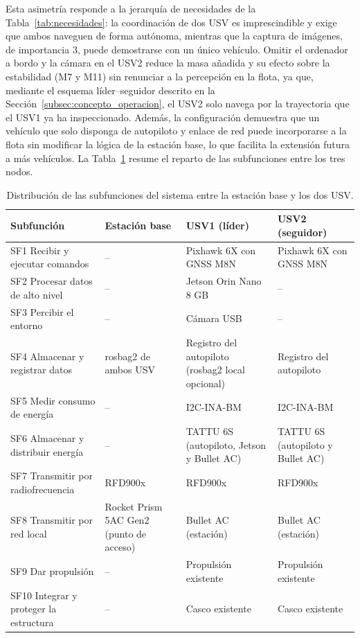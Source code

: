 Esta asimetría responde a la jerarquía de necesidades de la Tabla~\ref{tab:necesidades}: la coordinación de dos 
USV es imprescindible y exige que ambos naveguen de forma autónoma, mientras que la captura de imágenes, de 
importancia 3, puede demostrarse con un único vehículo. Omitir el ordenador a bordo y la cámara en el USV2 reduce 
la masa añadida y su efecto sobre la estabilidad (M7 y M11) sin renunciar a la percepción en la flota, ya que, 
mediante el esquema líder--seguidor descrito en la Sección~\ref{subsec:concepto_operacion}, el USV2 solo navega 
por la trayectoria que el USV1 ya ha inspeccionado. Además, la configuración demuestra que un vehículo que solo 
disponga de autopiloto y enlace de red puede incorporarse a la flota sin modificar la lógica de la estación base, 
lo que facilita la extensión futura a más vehículos. La Tabla~\ref{tab:distribucion_subfunciones} resume el reparto 
de las subfunciones entre los tres nodos.
 
\begin{table}[!htb]
\centering
\caption{Distribución de las subfunciones del sistema entre la estación base y los dos USV.}
\label{tab:distribucion_subfunciones}
\footnotesize
\renewcommand{\arraystretch}{1.15}
\begin{tabularx}{\textwidth}{|>{\raggedright\arraybackslash}p{3.7cm}|>{\raggedright\arraybackslash}X|>{\raggedright\arraybackslash}X|>{\raggedright\arraybackslash}X|}
\hline
\textbf{Subfunción} & \textbf{Estación base} & \textbf{USV1 (líder)} & \textbf{USV2 (seguidor)} \\ \hline
SF1 Recibir y ejecutar comandos & -- & Pixhawk 6X con GNSS M8N & Pixhawk 6X con GNSS M8N \\ \hline
SF2 Procesar datos de alto nivel & -- & Jetson Orin Nano 8 GB & -- \\ \hline
SF3 Percibir el entorno & -- & Cámara USB & -- \\ \hline
SF4 Almacenar y registrar datos & rosbag2 de ambos USV & Registro del autopiloto (rosbag2 local opcional) & Registro del 
autopiloto \\ \hline
SF5 Medir consumo de energía & -- & I2C-INA-BM & I2C-INA-BM \\ \hline
SF6 Almacenar y distribuir energía & -- & TATTU 6S (autopiloto, Jetson y Bullet AC) & TATTU 6S (autopiloto y Bullet AC) \\ \hline
SF7 Transmitir por radiofrecuencia & RFD900x & RFD900x & RFD900x \\ \hline
SF8 Transmitir por red local & Rocket Prism 5AC Gen2 (punto de acceso) & Bullet AC (estación) & Bullet AC 
(estación) \\ \hline
SF9 Dar propulsión & -- & Propulsión existente & Propulsión existente \\ \hline
SF10 Integrar y proteger la estructura & -- & Casco existente & Casco existente \\ \hline
\end{tabularx}
\end{table}
 
